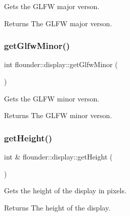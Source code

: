 Gets the G\+L\+FW major verson. 

\begin{DoxyReturn}{Returns}
The G\+L\+FW major verson. 
\end{DoxyReturn}
\mbox{\label{classflounder_1_1display_ac6fbd123308dce6a0d8f281a9ea55b37}} 
\subsubsection{\texorpdfstring{get\+Glfw\+Minor()}{getGlfwMinor()}}
{\footnotesize\ttfamily int flounder\+::display\+::get\+Glfw\+Minor (\begin{DoxyParamCaption}{ }\end{DoxyParamCaption})\hspace{0.3cm}{\ttfamily [inline]}}



Gets the G\+L\+FW minor verson. 

\begin{DoxyReturn}{Returns}
The G\+L\+FW minor verson. 
\end{DoxyReturn}
\mbox{\label{classflounder_1_1display_a2b3cea6e41121de9d790acf027036167}} 
\subsubsection{\texorpdfstring{get\+Height()}{getHeight()}}
{\footnotesize\ttfamily int \& flounder\+::display\+::get\+Height (\begin{DoxyParamCaption}{ }\end{DoxyParamCaption})}



Gets the height of the display in pixels. 

\begin{DoxyReturn}{Returns}
The height of the display. 
\end{DoxyReturn}
\mbox{\label{classflounder_1_1display_ac0506da092e74addb30ca2ecb9b5a0d5}} 
